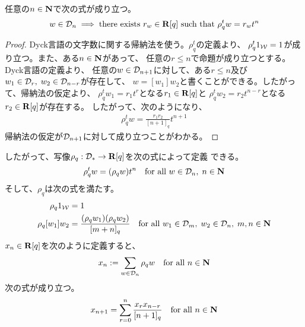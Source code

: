 {	\begin{todo}[kokomade]\label{todo:kokomade} %
	\end{todo} %
	任意の$n\in\mathbf{N}$で次の式が成り立つ。
	\begin{equation*}\begin{split}
		w\in{\ensuremath{{\mathcal{D}}}}_n \implies 
		\text{there exists } r_w\in\mathbf{R}[q] \text{ such that }
		\rho_q^t w = r_w t^n
	\end{split}\end{equation*}
	\begin{proof} %
		Dyck言語の文字数に関する帰納法を使う。$\rho_q^t$の定義より、
		$\rho_q^t1_{{\mathcal{W}}}=1$が成り立つ。また、ある$n\in\mathbf{N}$があって、
		任意の$r\le n$で命題が成り立つとする。Dyck言語の定義より、
		任意の$w\in{\ensuremath{{\mathcal{D}}}}_{n+1}$に対して、ある$r\le n$及び
		$w_1\in{\ensuremath{{\mathcal{D}}}}_r,\;w_2\in{\ensuremath{{\mathcal{D}}}}_{n-r}$が存在して、
		$w=[w_1]w_2$と書くことができる。したがって、帰納法の仮定より、
		$\rho_q^tw_1=r_1t^r$となる$r_1\in\mathbf{R}[q]$と
		$\rho_q^tw_2=r_2t^{n-r}$となる$r_2\in\mathbf{R}[q]$が存在する。
		したがって、次のようになり、
		\begin{equation*}\begin{split}
			\rho_q^tw = \frac{r_1r_2}{[n+1]_q} t^{n+1}
		\end{split}\end{equation*}
		帰納法の仮定が${{\mathcal{D}}}_{n+1}$に対して成り立つことがわかる。
	\end{proof} %
	したがって、写像$\rho_q:{{\mathcal{D}}}_*\to\mathbf{R}[q]$を次の式によって定義
	できる。
	\begin{equation*}\begin{split}
		\rho_q^t w = (\rho_qw)t^n
		\quad\text{for all } w\in{\ensuremath{{\mathcal{D}}}}_n,\; n\in\mathbf{N}
	\end{split}\end{equation*}
	そして、$\rho_q$は次の式を満たす。
	\begin{equation*}\begin{split}
		\rho_q 1_{{\mathcal{W}}} &= 1 \\
		\rho_q [w_1]w_2 &= \frac{(\rho_q w_1)(\rho_q w_2)}{[m+n]_q}
		\quad\text{for all } w_1\in{\ensuremath{{\mathcal{D}}}}_m,\;w_2\in{\ensuremath{{\mathcal{D}}}}_n,\;
		m,n\in\mathbf{N}
	\end{split}\end{equation*}
	$x_n\in\mathbf{R}[q]$を次のように定義すると、
	\begin{equation*}\begin{split}
		x_n := \sum_{w\in{\ensuremath{{\mathcal{D}}}}_n}\rho_q w
		\quad\text{for all } n\in\mathbf{N}
	\end{split}\end{equation*}
	次の式が成り立つ。
	\begin{equation*}\begin{split}
		x_{n+1} = \sum_{r=0}^n \frac{x_rx_{n-r}}{[n+1]_q}
		\quad\text{for all } n\in\mathbf{N}
	\end{split}\end{equation*}




}
